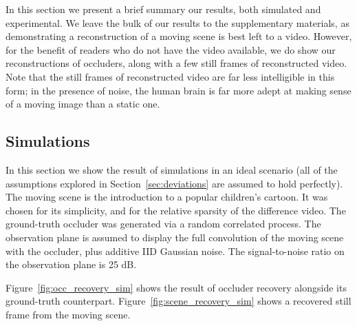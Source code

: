 In this section we present a brief summary our results, both simulated and experimental. We leave the bulk of our results to the supplementary materials, as demonstrating a reconstruction of a moving scene is best left to a video. However, for the benefit of readers who do not have the video available, we do show our reconstructions of occluders, along with a few still frames of reconstructed video. Note that the still frames of reconstructed video are far less intelligible in this form; in the presence of noise, the human brain is far more adept at making sense of a moving image than a static one.

\subsection{Simulations}

In this section we show the result of simulations in an ideal scenario (all of the assumptions explored in Section~\ref{sec:deviations} are assumed to hold perfectly). The moving scene is the introduction to a popular children's cartoon\footnotemark. It was chosen for its simplicity, and for the relative sparsity of the difference video\footnotemark. The ground-truth occluder was generated via a random correlated process. The observation plane is assumed to display the full convolution of the moving scene with the occluder, plus additive IID Gaussian noise. The signal-to-noise ratio on the observation plane is 25 dB.

Figure~\ref{fig:occ_recovery_sim} shows the result of occluder recovery alongside its ground-truth counterpart. Figure~\ref{fig:scene_recovery_sim} shows a recovered still frame from the moving scene.

